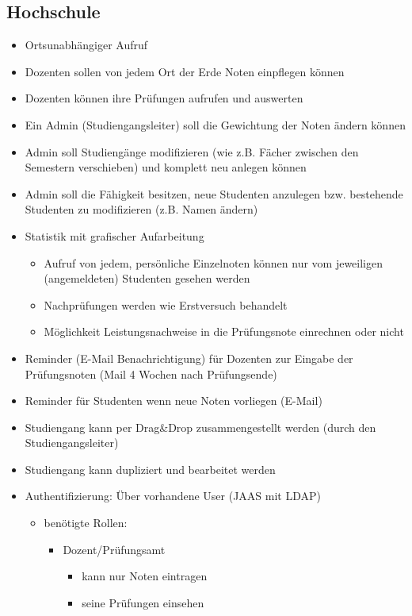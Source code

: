 \documentclass[12pt,a4paper,parskip]{scrreprt}
\begin{document}
\subsection{Hochschule}
\begin{itemize}
\item Ortsunabhängiger Aufruf
\item Dozenten sollen von jedem Ort der Erde Noten einpflegen können
\item Dozenten können ihre Prüfungen aufrufen und auswerten
\item Ein Admin (Studiengangsleiter) soll die Gewichtung der Noten ändern können
\item Admin soll Studiengänge modifizieren (wie z.B. Fächer zwischen den Semestern verschieben) und komplett neu anlegen können
\item Admin soll die Fähigkeit besitzen, neue Studenten anzulegen bzw. bestehende Studenten zu modifizieren (z.B. Namen ändern)
\item Statistik mit grafischer Aufarbeitung
\begin{itemize}
\item Aufruf von jedem, persönliche Einzelnoten können nur vom jeweiligen (angemeldeten) Studenten gesehen werden
\item Nachprüfungen werden wie Erstversuch behandelt
\item Möglichkeit Leistungsnachweise in die Prüfungsnote einrechnen oder nicht
\end{itemize}
\item Reminder (E-Mail Benachrichtigung) für Dozenten zur Eingabe der Prüfungsnoten (Mail 4 Wochen nach Prüfungsende)
\item Reminder für Studenten wenn neue Noten vorliegen (E-Mail)
\item Studiengang kann per Drag\&Drop zusammengestellt werden (durch den Studiengangsleiter)
\item Studiengang kann dupliziert und bearbeitet werden
\item Authentifizierung: Über vorhandene User (JAAS mit LDAP)
\begin{itemize}
\item benötigte Rollen:
\begin{itemize}
\item Dozent/Prüfungsamt
\begin{itemize}
\item kann nur Noten eintragen
\item seine Prüfungen einsehen
\end{itemize}

\end{itemize}
\end{itemize}
\end{itemize}
\end{document}
